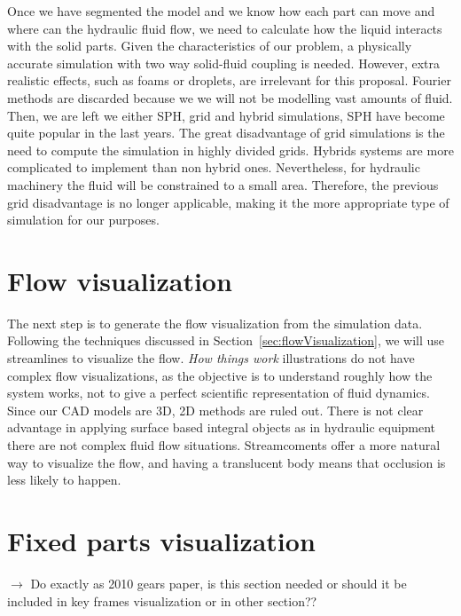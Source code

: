 Once we have segmented the model and we know how each part can move and where can the hydraulic fluid flow, we need to calculate how the liquid interacts with the solid parts.
Given the characteristics of our problem, a physically accurate simulation with two way solid-fluid coupling is needed.
However, extra realistic effects, such as foams or droplets, are irrelevant for this proposal.
Fourier methods are discarded because we we will not be modelling vast amounts of fluid.
Then, we are left we either SPH, grid and hybrid simulations, SPH have become quite popular in the last years.
The great disadvantage of grid simulations is the need to compute the simulation in highly divided grids.
Hybrids systems are more complicated to implement than non hybrid ones.
Nevertheless, for hydraulic machinery the fluid will be constrained to a small area.
Therefore, the previous grid disadvantage is no longer applicable, making it the more appropriate type of simulation for our purposes.


\section{Flow visualization}

The next step is to generate the flow visualization from the simulation data.
Following the techniques discussed in Section~\ref{sec:flowVisualization}, we will use streamlines to visualize the flow.
\textit{How things work} illustrations do not have complex flow visualizations, as the objective is to understand roughly how the system works, not to give a perfect scientific representation of fluid dynamics.
Since our CAD models are 3D, 2D methods are ruled out.
There is not clear advantage in applying surface based integral objects as in hydraulic equipment there are not complex fluid flow situations.
Streamcoments offer a more natural way to visualize the flow, and having a translucent body means that occlusion is less likely to happen.

\section{Fixed parts visualization}

$\rightarrow$ Do exactly as 2010 gears paper, is this section needed or should it be included in key frames visualization or in other section??

